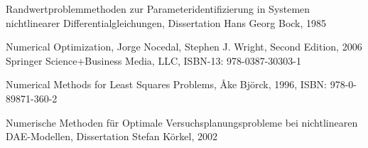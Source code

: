 \documentclass{scrartcl}[12pt, halfparskip]
\numberwithin{equation}{section}
\numberwithin{figure}{section}
\numberwithin{table}{section}
\begin{document}
\begin{thebibliography}{9}
	Randwertproblemmethoden zur Parameteridentifizierung in Systemen nichtlinearer Differentialgleichungen,
	Dissertation Hans Georg Bock, 1985
	
	Numerical Optimization,
	Jorge Nocedal, Stephen J. Wright,
	Second Edition, 2006 Springer Science+Business Media, LLC, ISBN-13: 978-0387-30303-1
	
	Numerical Methods for Least Squares Problems,
	Åke Björck, 1996,
	ISBN: 978-0-89871-360-2
	
	Numerische Methoden
	für Optimale Versuchsplanungsprobleme
	bei nichtlinearen DAE-Modellen,
	Dissertation Stefan Körkel, 2002
  
\end{thebibliography}
\end{document}

